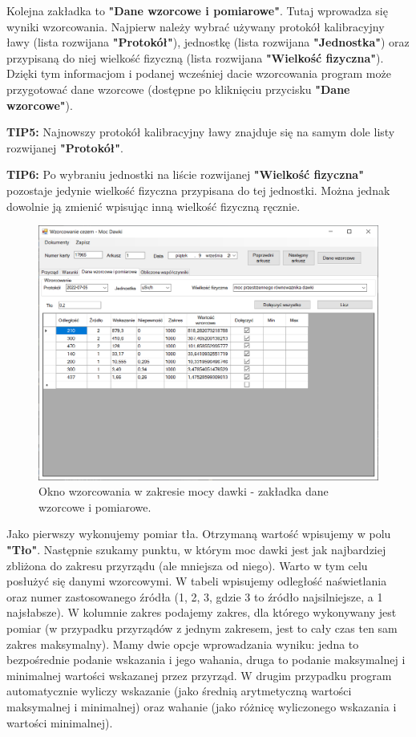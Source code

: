 Kolejna zakładka to \textbf{"Dane wzorcowe i pomiarowe"}. Tutaj wprowadza się wyniki wzorcowania. Najpierw należy wybrać używany protokół kalibracyjny ławy (lista rozwijana \textbf{"Protokół"}), jednostkę (lista rozwijana \textbf{"Jednostka"}) oraz przypisaną do niej wielkość fizyczną (lista rozwijana \textbf{"Wielkość fizyczna"}). Dzięki tym informacjom i podanej wcześniej dacie wzorcowania program może przygotować dane wzorcowe (dostępne po kliknięciu przycisku \textbf{"Dane wzorcowe"}).

\textbf{TIP5:} Najnowszy protokół kalibracyjny ławy znajduje się na samym dole listy rozwijanej \textbf{"Protokół"}.

\textbf{TIP6:} Po wybraniu jednostki na liście rozwijanej \textbf{"Wielkość fizyczna"} pozostaje jedynie wielkość fizyczna przypisana do tej jednostki. Można jednak dowolnie ją zmienić wpisując inną wielkość fizyczną ręcznie.

\begin{figure}[htb]
	\centering
	\includegraphics[width=\columnwidth]{obrazki/Wzorcowanie/moc_dawki/dane.png}
	\caption{Okno wzorcowania w zakresie mocy dawki - zakładka dane wzorcowe i pomiarowe.}
	\label{mocDane}
\end{figure}

Jako pierwszy wykonujemy pomiar tła. Otrzymaną wartość wpisujemy w polu \textbf{"Tło"}. Następnie szukamy punktu, w którym moc dawki jest jak najbardziej zbliżona do zakresu przyrządu (ale mniejsza od niego). Warto w tym celu posłużyć się danymi wzorcowymi. W tabeli wpisujemy odległość naświetlania oraz numer zastosowanego źródła (1, 2, 3, gdzie 3 to źródło najsilniejsze, a 1 najsłabsze). W kolumnie zakres podajemy zakres, dla którego wykonywany jest pomiar (w przypadku przyrządów z jednym zakresem, jest to cały czas ten sam zakres maksymalny). Mamy dwie opcje wprowadzania wyniku: jedna to bezpośrednie podanie wskazania i jego wahania, druga to podanie maksymalnej i minimalnej wartości wskazanej przez przyrząd. W drugim przypadku program automatycznie wyliczy wskazanie (jako średnią arytmetyczną wartości maksymalnej i minimalnej) oraz wahanie (jako różnicę wyliczonego wskazania i wartości minimalnej).

